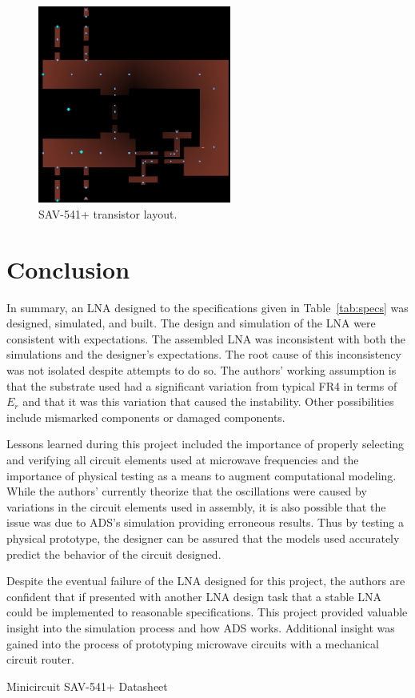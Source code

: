 \documentclass[conference]{IEEEtran}
\begin{document}
\begin{figure}[!h]
\centering
\includegraphics[width=2.5in]{LNApics/LNAlayout.png}
\caption{SAV-541+ transistor layout.}
\label{fig:lnaLayout}
\end{figure}

\section{Conclusion}
In summary, an LNA designed to the specifications given in Table~\ref{tab:specs} was designed, simulated, and built. The design and simulation of the LNA were consistent with expectations. The assembled LNA was inconsistent with both the simulations and the designer's expectations. The root cause of this inconsistency was not isolated despite attempts to do so. The authors' working assumption is that the substrate used had a significant variation from typical FR4 in terms of $E_r$ and that it was this variation that caused the instability. Other possibilities include mismarked components or damaged components. 

Lessons learned during this project included the importance of properly selecting and verifying all circuit elements used at microwave frequencies and the importance of physical testing as a means to augment computational modeling. While the authors' currently theorize that the oscillations were caused by variations in the circuit elements used in assembly, it is also possible that the issue was due to ADS's simulation providing erroneous results. Thus by testing a physical prototype, the designer can be assured that the models used accurately predict the behavior of the circuit designed.

Despite the eventual failure of the LNA designed for this project, the authors are confident that if presented with another LNA design task that a stable LNA could be implemented to reasonable specifications. This project provided valuable insight into the simulation process and how ADS works. Additional insight was gained into the process of prototyping microwave circuits with a mechanical circuit router.
\begin{thebibliography}{1}
Minicircuit SAV-541+ Datasheet
\end{thebibliography}
\end{document}
